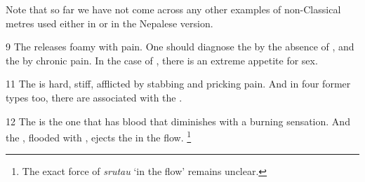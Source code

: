 Note that so far we have not come across any other examples of non-Classical metres used either in \cite{vulgate} or in the Nepalese version. 

\begin{translation}
\item [9] The  releases foamy  with pain. 
One should diagnose the  by the absence of , and the  by chronic pain.
In the case of , there is an extreme appetite for sex.

\item [11] The  is hard, stiff, afflicted by stabbing and pricking pain.
And in four former types too, there are  associated with the .

\item [12] The  is the one that has blood that diminishes with a burning sensation.
And the , flooded with , ejects the  in the flow. 
	\footnote{%
	The exact force of \emph{srutau} ‘in the flow’ remains unclear.%
	}


\end{translation}
